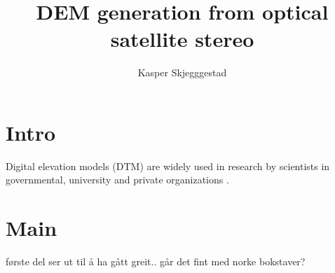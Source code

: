 \documentclass[a4paper,UKenglish]{article}
\title{DEM generation from optical satellite stereo}
\author{Kasper Skjegggestad}
\begin{document}
\maketitle
\tableofcontents

\section{Intro}

Digital elevation models (DTM) are widely used in research by scientists in governmental, university and private organizations \citep{toutin08}.

\section{Main}

første del ser ut til å ha gått greit.. går det fint med norke bokstaver?



\end{document}
